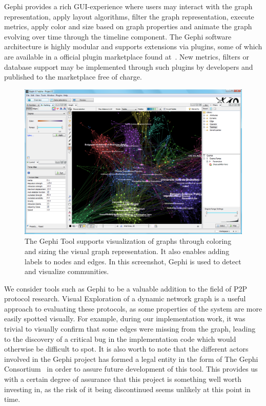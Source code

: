 Gephi provides a rich GUI-experience where users may interact with the
graph representation, apply layout algorithms, filter the graph
representation, execute metrics, apply color and size based on graph
properties and animate the graph evolving over time through the timeline
component.  The Gephi software architecture is highly modular and
supports extensions via plugins, some of which are available in a
official plugin marketplace found at~\cite{gephimarketplace}. New
metrics, filters or database support may be implemented through such
plugins by developers and published to the marketplace free of charge.

\begin{figure}
\centering
\includegraphics[width=\textwidth]{img/gephi1}
\caption{The Gephi Tool supports
visualization of graphs through coloring and sizing the visual graph
representation. It also enables adding labels to nodes and edges. In
this screenshot, Gephi is used to detect and visualize
communities.}
\label{img:gephi1}
\end{figure}

We consider tools such as Gephi to be a valuable addition to the field
of P2P protocol research. Visual Exploration of a dynamic network graph
is a useful approach to evaluating these protocols, as some properties
of the system are more easily spotted visually. For example, during our
implementation work, it was trivial to visually confirm that some edges
were missing from the graph, leading to the discovery of a critical bug
in the implementation code which would otherwise be difficult to spot.
It is also worth to note that the different actors involved in the Gephi
project has formed a legal entity in the form of The Gephi
Consortium~\cite{gephi-consortium} in order to assure future development
of this tool. This provides us with a certain degree of assurance that
this project is something well worth investing in, as the risk of it
being discontinued seems unlikely at this point in time.

